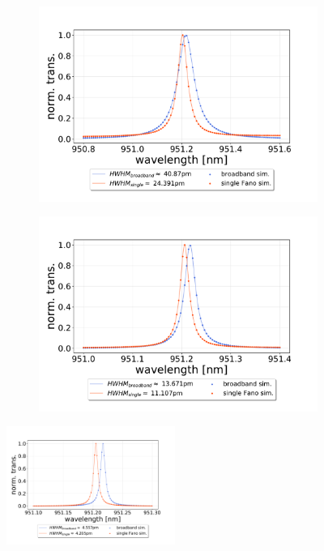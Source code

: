 \begin{figure}[h!]
\begin{subfigure}[b]{0.49\textwidth}
        \caption{}
        \label{fig:single_vs_broadband_simulation_30um}
    \end{subfigure}
    \begin{subfigure}[b]{0.49\textwidth}
        \includegraphics[width=\textwidth]{figures/sim_single_vs_broadband_90um.pdf}
        \caption{}
        \label{fig:single_vs_broadband_simulation_90um}
    \end{subfigure}
    \begin{subfigure}[b]{0.49\textwidth}
        \includegraphics[width=\textwidth]{figures/sim_single_vs_broadband_270um.pdf}
        \caption{}
        \label{fig:single_vs_broadband_simulation_270um}
    \end{subfigure}
    \includegraphics[width=0.49\textwidth]{figures/sim_single_vs_broadband_810um.pdf}
    \caption{}
    \label{fig:single_vs_broadband_simulation_810um}
\end{figure}

